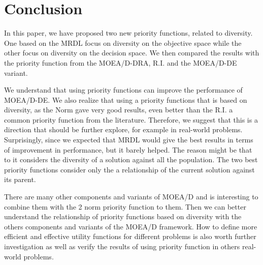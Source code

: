\section{Conclusion}

In this paper, we have proposed two new priority functions, related to diversity. One based on the MRDL focus on diversity on the objective space while the other focus on diversity on the decision space. We then compared the results with the priority function from the MOEA/D-DRA, R.I. and the MOEA/D-DE variant.

We understand that using priority functions can improve the performance of MOEA/D-DE. We also realize that using a priority functions that is based on diversity, as the Norm gave very good results, even better than the R.I. a common priority function from the literature. Therefore, we suggest that this is a direction that should be further explore, for example in real-world problems. Surprisingly, since we expected that MRDL would give the best results in terms of improvement in performance, but it barely helped. The reason might be that to it considers the diversity of a solution against all the population. The two best priority functions consider only the a relationship of the current solution against its parent.

There are many other components and variants of MOEA/D and is interesting to combine them with the 2 norm priority function to them. Then we can better understand the relationship of priority functions based on diversity with the others components and variants of the MOEA/D framework. How to define more efficient and effective utility functions for different problems is also worth further investigation as well as verify the results of using priority function in others real-world problems.